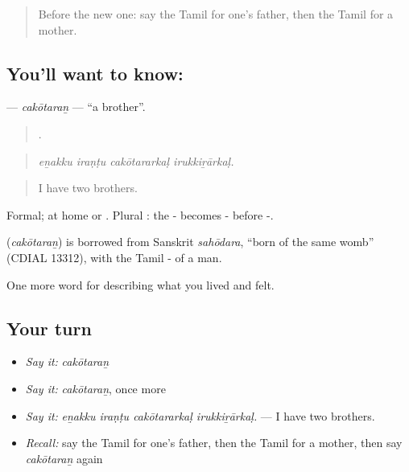 \begin{quote}
Before the new one: say the Tamil for one’s father, then the Tamil for a mother.
\end{quote}

\subsection*{You'll want to know: }
\textbf{} — \emph{cakōtaraṉ} — \textquotedblleft{}a brother\textquotedblright{}.

\begin{quote}
   .
\end{quote}

\begin{quote}
\emph{eṉakku iraṇṭu cakōtararkaḷ irukkiṟārkaḷ.}
\end{quote}

\begin{quote}
I have two brothers.
\end{quote}

Formal; at home  or . Plural : the - becomes - before -.

\begin{cousinweb}
\textbf{} (\emph{cakōtaraṉ}) is borrowed from Sanskrit \emph{sahōdara}, \textquotedblleft{}born of the same womb\textquotedblright{} (CDIAL 13312), with the Tamil - of a man.
\end{cousinweb}

\begin{grammarlens}[title={What you've built}]
One more word for describing what you lived and felt.
\end{grammarlens}

\subsection*{Your turn}
\begin{itemize}
\raggedright
  \item \emph{Say it:} \emph{cakōtaraṉ}
  \item \emph{Say it:} \emph{cakōtaraṉ}, once more
  \item \emph{Say it:} \emph{eṉakku iraṇṭu cakōtararkaḷ irukkiṟārkaḷ.} — I have two brothers.
  \item \emph{Recall:} say the Tamil for one’s father, then the Tamil for a mother, then say \emph{cakōtaraṉ} again
\end{itemize}

